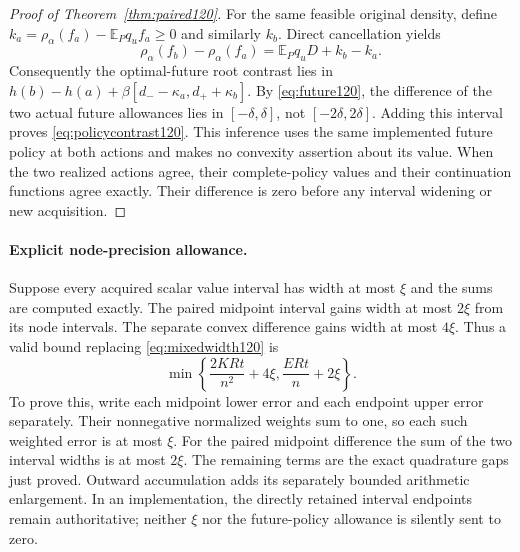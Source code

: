 \begin{proof}[Proof of Theorem~\ref{thm:paired120}]
For the same feasible original density, define
$k_a=\rho_\alpha(f_a)-\mathbb E_Pq_uf_a\ge0$ and similarly $k_b$.
Direct cancellation yields
\[
 \rho_\alpha(f_b)-\rho_\alpha(f_a)
     =\mathbb E_Pq_uD+k_b-k_a.
\]
Consequently the optimal-future root contrast lies in
$h(b)-h(a)+\beta[d_--\kappa_a,d_++\kappa_b]$.
By \eqref{eq:future120}, the difference of the two actual future
allowances lies in $[-\delta,\delta]$, not $[-2\delta,2\delta]$.
Adding this interval proves \eqref{eq:policycontrast120}.
This inference uses the same implemented future policy at both
actions and makes no convexity assertion about its value.
When the two realized actions agree, their complete-policy values
and their continuation functions agree exactly.  Their difference
is zero before any interval widening or new acquisition.
\end{proof}

\paragraph{Explicit node-precision allowance.}
Suppose every acquired scalar value interval has width at most
$\xi$ and the sums are computed exactly.  The paired midpoint
interval gains width at most $2\xi$ from its node intervals.
The separate convex difference gains width at most $4\xi$.
Thus a valid bound replacing \eqref{eq:mixedwidth120} is
\begin{equation}\label{eq:inexactpairwidth120}
 \min\left\{\frac{2KRt}{n^2}+4\xi,
                      \frac{ERt}{n}+2\xi\right\}.
\end{equation}
To prove this, write each midpoint lower error and each endpoint
upper error separately.  Their nonnegative normalized weights sum
to one, so each such weighted error is at most $\xi$.
For the paired midpoint difference the sum of the two interval
widths is at most $2\xi$.  The remaining terms are the exact
quadrature gaps just proved.  Outward accumulation adds its
separately bounded arithmetic enlargement.  In an implementation,
the directly retained interval endpoints remain authoritative;
neither $\xi$ nor the future-policy allowance is silently sent to zero.

